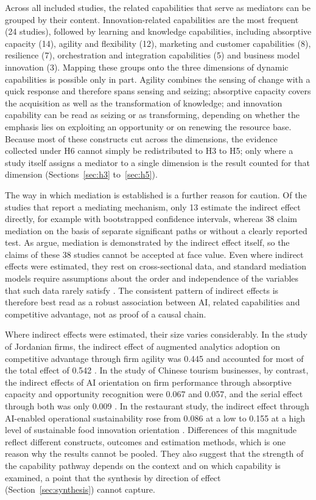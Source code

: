 Across all included studies, the related capabilities that serve as mediators can be grouped by their content. Innovation-related capabilities are the most frequent (24 studies), followed by learning and knowledge capabilities, including absorptive capacity (14), agility and flexibility (12), marketing and customer capabilities (8), resilience (7), orchestration and integration capabilities (5) and business model innovation (3). Mapping these groups onto the three dimensions of dynamic capabilities is possible only in part. Agility combines the sensing of change with a quick response and therefore spans sensing and seizing; absorptive capacity covers the acquisition as well as the transformation of knowledge; and innovation capability can be read as seizing or as transforming, depending on whether the emphasis lies on exploiting an opportunity or on renewing the resource base. Because most of these constructs cut across the dimensions, the evidence collected under H6 cannot simply be redistributed to H3 to H5; only where a study itself assigns a mediator to a single dimension is the result counted for that dimension (Sections~\ref{sec:h3} to~\ref{sec:h5}).

The way in which mediation is established is a further reason for caution. Of the studies that report a mediating mechanism, only 13 estimate the indirect effect directly, for example with bootstrapped confidence intervals, whereas 38 claim mediation on the basis of separate significant paths or without a clearly reported test. As \textcite{zhao2010} argue, mediation is demonstrated by the indirect effect itself, so the claims of these 38 studies cannot be accepted at face value. Even where indirect effects were estimated, they rest on cross-sectional data, and standard mediation models require assumptions about the order and independence of the variables that such data rarely satisfy \parencite{rohrer2022}. The consistent pattern of indirect effects is therefore best read as a robust association between AI, related capabilities and competitive advantage, not as proof of a causal chain.

Where indirect effects were estimated, their size varies considerably. In the study of Jordanian firms, the indirect effect of augmented analytics adoption on competitive advantage through firm agility was 0.445 and accounted for most of the total effect of 0.542 \parencite{srahin2026}. In the study of Chinese tourism businesses, by contrast, the indirect effects of AI orientation on firm performance through absorptive capacity and opportunity recognition were 0.067 and 0.057, and the serial effect through both was only 0.009 \parencite{li2026}. In the restaurant study, the indirect effect through AI-enabled operational sustainability rose from 0.086 at a low to 0.155 at a high level of sustainable food innovation orientation \parencite{texeira2026}. Differences of this magnitude reflect different constructs, outcomes and estimation methods, which is one reason why the results cannot be pooled. They also suggest that the strength of the capability pathway depends on the context and on which capability is examined, a point that the synthesis by direction of effect (Section~\ref{sec:synthesis}) cannot capture.

